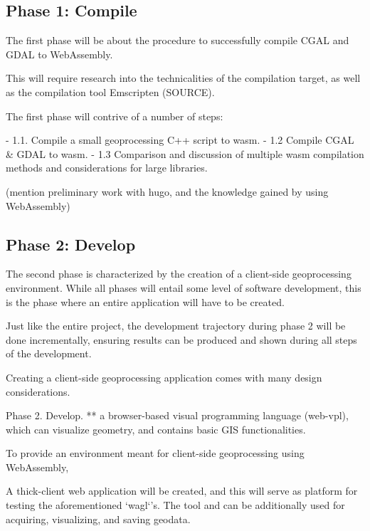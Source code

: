 \subsection{Phase 1: Compile}

The first phase will be about the procedure to successfully compile CGAL and GDAL to WebAssembly.

This will require research into the technicalities of the compilation target, as well as the compilation tool Emscripten (SOURCE).

The first phase will contrive of a number of steps:

- 1.1. Compile a small geoprocessing C++ script to wasm.
- 1.2  Compile CGAL \& GDAL to wasm.
- 1.3  Comparison and discussion of multiple wasm compilation methods and considerations for large libraries.


(mention preliminary work with hugo, and the knowledge gained by using WebAssembly)


\subsection{Phase 2: Develop}



The second phase is characterized by the creation of a client-side geoprocessing environment. While all phases will entail some level of software development, this is the phase where an entire application will have to be created.

Just like the entire project, the development trajectory during phase 2 will be done incrementally, ensuring results can be produced and shown during all steps of the development. 

Creating a client-side geoprocessing application comes with many design considerations. 



Phase 2. Develop. ** a browser-based visual programming language (web-vpl), which can visualize geometry, and contains basic GIS functionalities.  


To provide an environment meant for client-side geoprocessing using WebAssembly,



A thick-client web application will be created, and this will serve as platform for testing the aforementioned ‘wagl‘’s. The tool and can be additionally used for acquiring, visualizing, and saving geodata.

